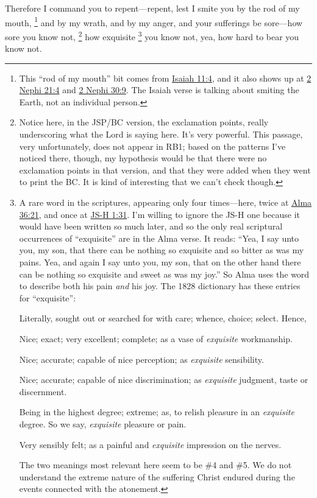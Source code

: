 		Therefore I command you to repent---repent, lest I smite you by the rod of my mouth,%
			\footnote{%
				This ``rod of my mouth'' bit comes from \hyperref[ISAIAH-11-4]{Isaiah 11:4}, and it also shows up at \hyperref[2NEPHI-21-4]{2 Nephi 21:4} and \hyperref[2NEPHI-30-9]{2 Nephi 30:9}. The Isaiah verse is talking about smiting the Earth, not an individual person.
				}
		and by my wrath, and by my anger, and your sufferings be sore---how sore you know not,%
			\footnote{%
				Notice here, in the JSP/BC version, the exclamation points, really underscoring what the Lord is saying here. It's very powerful. This passage, very unfortunately, does not appear in RB1; based on the patterns I've noticed there, though, my hypothesis would be that there were no exclamation points in that version, and that they were added when they went to print the BC. It is kind of interesting that we can't check though.
				}
		how exquisite%
			\footnote{%
				A rare word in the scriptures, appearing only four times---here, twice at \hyperref[ALMA-36-21]{Alma 36:21}, and once at \hyperref[JSHISTORY-1-31]{JS-H 1:31}. I'm willing to ignore the JS-H one because it would have been written so much later, and so the only real scriptural occurrences of ``exquisite'' are in the Alma verse. It reads: ``Yea, I say unto you, my son, that there can be nothing so exquisite and so bitter as was my pains. Yea, and again I say unto you, my son, that on the other hand there can be nothing so exquisite and sweet as was my joy.'' So Alma uses the word to describe both his pain \textit{and} his joy. The 1828 dictionary has these entries for ``exquisite'':
					\begin{compactitem}
						\item Literally, sought out or searched for with care; whence, choice; select. Hence,
						\item[1] Nice; exact; very excellent; complete; as a vase of \textit{exquisite} workmanship.
						\item[2] Nice; accurate; capable of nice perception; as \textit{exquisite} sensibility.
						\item[3] Nice; accurate; capable of nice discrimination; as \textit{exquisite} judgment, taste or discernment.
						\item[4] Being in the highest degree; extreme; as, to relish pleasure in an \textit{exquisite} degree. So we say, \textit{exquisite} pleasure or pain.
						\item[5] Very sensibly felt; as a painful and \textit{exquisite} impression on the nerves.
					\end{compactitem}
				The two meanings most relevant here seem to be \#4 and \#5. We do not understand the extreme nature of the suffering Christ endured during the events connected with the atonement.
				}
		you know not, yea, how hard to bear you know not.

